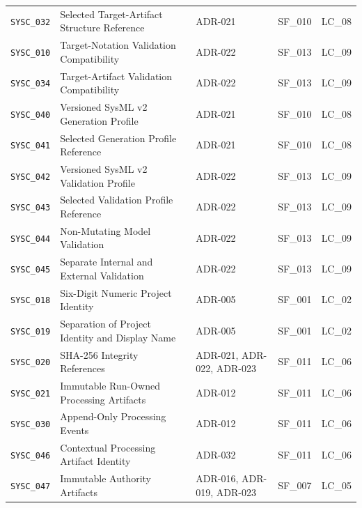 \begin{xltabular}{\textwidth}{@{}p{1.65cm}X p{2.25cm}p{2.0cm}p{1.7cm}@{}}
\texttt{SYSC\_032} & Selected Target-Artifact Structure Reference & ADR-021 & SF\_010 & LC\_08\\

\texttt{SYSC\_010} & Target-Notation Validation Compatibility & ADR-022 & SF\_013 & LC\_09\\

\texttt{SYSC\_034} & Target-Artifact Validation Compatibility & ADR-022 & SF\_013 & LC\_09\\

\texttt{SYSC\_040} & Versioned SysML v2 Generation Profile & ADR-021 & SF\_010 & LC\_08\\

\texttt{SYSC\_041} & Selected Generation Profile Reference & ADR-021 & SF\_010 & LC\_08\\

\texttt{SYSC\_042} & Versioned SysML v2 Validation Profile & ADR-022 & SF\_013 & LC\_09\\

\texttt{SYSC\_043} & Selected Validation Profile Reference & ADR-022 & SF\_013 & LC\_09\\

\texttt{SYSC\_044} & Non-Mutating Model Validation & ADR-022 & SF\_013 & LC\_09\\

\texttt{SYSC\_045} & Separate Internal and External Validation & ADR-022 & SF\_013 & LC\_09\\

\texttt{SYSC\_018} & Six-Digit Numeric Project Identity & ADR-005 & SF\_001 & LC\_02\\

\texttt{SYSC\_019} & Separation of Project Identity and Display Name & ADR-005 & SF\_001 & LC\_02\\

\texttt{SYSC\_020} & SHA-256 Integrity References & ADR-021, ADR-022, ADR-023 & SF\_011 & LC\_06\\

\texttt{SYSC\_021} & Immutable Run-Owned Processing Artifacts & ADR-012 & SF\_011 & LC\_06\\

\texttt{SYSC\_030} & Append-Only Processing Events & ADR-012 & SF\_011 & LC\_06\\

\texttt{SYSC\_046} & Contextual Processing Artifact Identity & ADR-032 & SF\_011 & LC\_06\\

\texttt{SYSC\_047} & Immutable Authority Artifacts & ADR-016, ADR-019, ADR-023 & SF\_007 & LC\_05\\


\end{xltabular}
